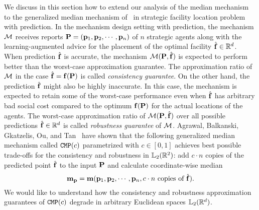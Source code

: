 
We discuss in this section how to extend our analysis of the median mechanism to the generalized median mechanism of~\cite{AgrawalBGTX22} in strategic facility location problem with prediction. In the mechanism design setting with prediction, the mechanism $\mech$ receives  reports $\locs=(\loc_1,\loc_2,\cdots,\loc_n)$ of $n$ strategic agents along with the learning-augmented advice for the placement of the optimal facility $\pred\in\reals^d$. When prediction $\pred$ is accurate, the mechanism $\mech(\locs,\pred)$ is expected to perform better than the worst-case approximation guarantee. The approximation ratio of $\mech$ in the case $\pred=\facility(\locs)$ is called \emph{consistency guarantee}. On the other hand, the prediction $\pred$ might also be highly inaccurate. In this case, the mechanism is expected to retain some of the worst-case performance even when $\pred$ has arbitrary bad social cost compared to the optimum $\facility(\locs)$ for the actual locations of the agents. The worst-case approximation ratio of $\mech(\locs,\pred)$ over all possible predictions $\pred\in\reals^d$
is called \emph{robustness guarantee} of $\mech$.  
Agrawal, Balkanski, Gkatzelis, Ou, and Tan~\cite{AgrawalBGTX22} have shown that the following generalized median mechanism called $\CMP(c)$ parametrized with $c\in[0,1]$ achieves best possible trade-offs for the consistency and robustness in $\lqnorm[2](\reals^2)$: add $c\cdot n$ copies of the predicted point $\pred$ to the input $\locs$ and calculate coordinate-wise median 
\[
\cmp=\median(\loc_1,\loc_2,\cdots,\loc_n, c\cdot n\text{ copies of}\ \pred).
\]
We would like to understand how the consistency and robustness approximation guarantees of $\CMP(c)$ degrade in 
arbitrary Euclidean spaces $\lqnorm[2](\reals^d)$. 

